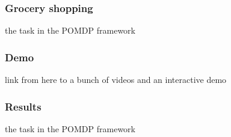 \documentclass[10pt, compress]{beamer}
\begin{document}
\begin{frame}[fragile]
  \frametitle{Grocery shopping}

  the task in the POMDP framework
\end{frame}


\begin{frame}[fragile]
  \frametitle{Demo}

  link from here to a bunch of videos and an interactive demo
\end{frame}

\begin{frame}[fragile]
  \frametitle{Results}

  the task in the POMDP framework
\end{frame}

\end{document}
